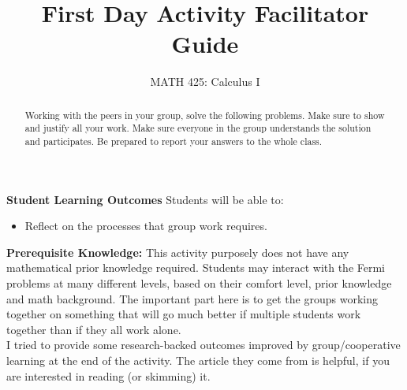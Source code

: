 \documentclass{ximera}
\title{First Day Activity Facilitator Guide}
\author{MATH 425: Calculus I}
\begin{document}
\begin{abstract}
    Working with the peers in your group, solve the following problems. Make sure to show and justify all your work. Make sure everyone in the group understands the solution and participates. Be prepared to report your answers to the whole class. 
\end{abstract}
\maketitle

\textbf{Student Learning Outcomes}
Students will be able to:
\begin{itemize}
    \item Reflect on the processes that group work requires.
\end{itemize}

\textbf{Prerequisite Knowledge:} This activity purposely does not have any mathematical prior knowledge required.  Students may interact with the Fermi problems at many different levels, based on their comfort level, prior knowledge and math background.  The important part here is to get the groups working together on something that will go much better if multiple students work together than if they all work alone.  \\

I tried to provide some research-backed outcomes improved by group/cooperative learning at the end of the activity.  The article they come from is helpful, if you are interested in reading (or skimming) it.
\end{document}
